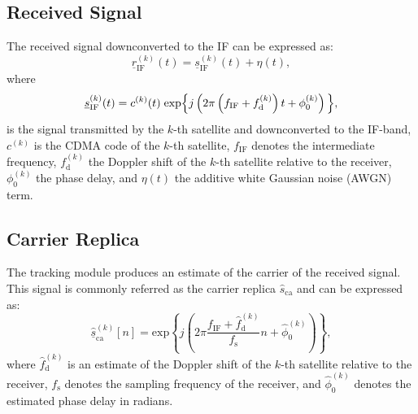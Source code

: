 \documentclass{juliacon}
\begin{document}
\subsection*{Received Signal}\label{sec:received-signal}
The received signal downconverted to the IF can be expressed as:
\begin{equation}\label{eqn:received-signal}
    \underline{r}^{(k)}_{\mathrm{IF}}(t)=\underline{s}_{\mathrm{IF}}^{(k)}(t)+\eta(t),
\end{equation}
where
\begin{equation}
    \underline{s}_{\mathrm{IF}}^{(k)}(t)=c^{(k)}(t) \hspace{1mm} \mathrm{exp}\Big\{j\left(2 \pi\left(f_{\mathrm{IF}}+f^{(k)}_{\mathrm{d}}\right) t+\phi^{(k)}_{0}\right)\Big\},
\end{equation}
is the signal transmitted by the $k$-th satellite and downconverted to the IF-band, $c^{(k)}$ is the CDMA code of the $k$-th satellite, $f_{\mathrm{IF}}$ denotes the intermediate frequency, $f^{(k)}_{\mathrm{d}}$ the Doppler shift of the $k$-th satellite relative to the receiver, $\phi^{(k)}_0$ the phase delay, and $\eta(t)$ the additive white Gaussian noise (AWGN) term.

\subsection*{Carrier Replica}
The tracking module produces an estimate of the carrier of the received signal. This signal is commonly referred as the carrier replica $\hat{s}_{\mathrm{ca}}$ and can be expressed as:
\begin{equation}\label{eqn:carrier-replica}
    \underline{\hat{s}}_{\mathrm{ca}}^{(k)}[n]= \mathrm{exp}\left\{j\left(2 \pi \frac{f_{\mathrm{IF}} + \hat{f}^{(k)}_{\mathrm{d}}}{f_{\mathrm{s}}} n+\hat{\phi}^{(k)}_{0}\right)\right\},
\end{equation}
where $\hat{f}^{(k)}_{\mathrm{d}}$ is an estimate of the Doppler shift of the $k$-th satellite relative to the receiver, $f_{\mathrm{s}}$ denotes the sampling frequency of the receiver, and $\hat{\phi}^{(k)}_{0}$ denotes the estimated phase delay in radians.
\end{document}
